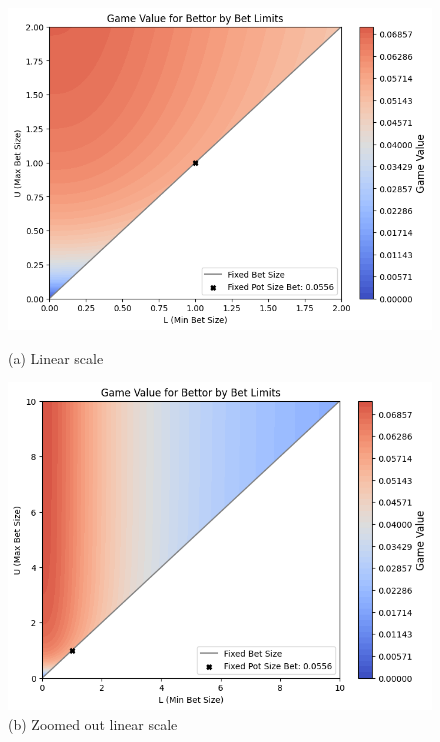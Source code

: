 \documentclass[a4paper,12pt]{article}
\theoremstyle{plain}
\theoremstyle{definition}
\begin{document}
\begin{figure}[h!]
    \begin{adjustwidth}{-1in}{-1in}
        \centering
        \begin{minipage}{0.6\textwidth}
            \centering
            \includegraphics[width=\textwidth]{payoffs_by_limits.png}
            \caption*{(a) Linear scale}
        \end{minipage}
        \hspace{0.05\textwidth}
        \begin{minipage}{0.6\textwidth}
            \centering
            \includegraphics[width=\textwidth]{payoffs_by_limits_wide.png}
            \caption*{(b) Zoomed out linear scale}

\end{minipage}
\end{adjustwidth}
\end{figure}
\end{document}
